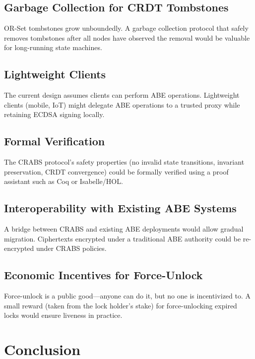 \documentclass[sigconf,nonacm]{acmart}
\newcommand{\crab}{\textsc{CRABS}}
\begin{document}
\subsection{Garbage Collection for CRDT Tombstones}

OR-Set tombstones grow unboundedly. A garbage collection protocol that safely removes tombstones after all nodes have observed the removal would be valuable for long-running state machines.

\subsection{Lightweight Clients}

The current design assumes clients can perform ABE operations. Lightweight clients (mobile, IoT) might delegate ABE operations to a trusted proxy while retaining ECDSA signing locally.

\subsection{Formal Verification}

The \crab{} protocol's safety properties (no invalid state transitions, invariant preservation, CRDT convergence) could be formally verified using a proof assistant such as Coq or Isabelle/HOL.

\subsection{Interoperability with Existing ABE Systems}

A bridge between \crab{} and existing ABE deployments would allow gradual migration. Ciphertexts encrypted under a traditional ABE authority could be re-encrypted under \crab{} policies.

\subsection{Economic Incentives for Force-Unlock}

Force-unlock is a public good---anyone can do it, but no one is incentivized to. A small reward (taken from the lock holder's stake) for force-unlocking expired locks would ensure liveness in practice.

\section{Conclusion}
\end{document}
